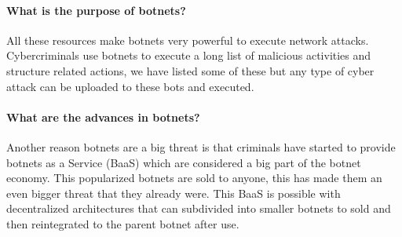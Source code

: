 \paragraph{What is the purpose of botnets?} All these resources make botnets very powerful to execute network attacks. 
\cite{bot-intro}
Cybercriminals use botnets to execute a long list of malicious activities and structure related actions, we have listed some of these but any type of cyber attack can be uploaded to these bots and executed.
\cite{honeynet2}

\cite{survey5}
\paragraph{What are the advances in botnets?} Another reason botnets are a big threat is that criminals have started to provide botnets as a Service (BaaS) which are considered a big part of the botnet economy. This popularized botnets are sold to anyone, this has made them an even bigger threat that they already were.
This BaaS is possible with decentralized architectures that can subdivided into smaller botnets to sold and then reintegrated to the parent botnet after use.
\cite{tracking}

\cite{memoire1}
